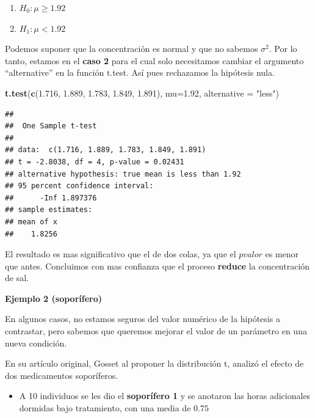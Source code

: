 \documentclass[
]{book}
\newenvironment{Shaded}{\begin{snugshade}}{\end{snugshade}}
\newcommand{\AttributeTok}[1]{\textcolor[rgb]{0.13,0.29,0.53}{#1}}
\newcommand{\FloatTok}[1]{\textcolor[rgb]{0.00,0.00,0.81}{#1}}
\newcommand{\FunctionTok}[1]{\textcolor[rgb]{0.13,0.29,0.53}{\textbf{#1}}}
\newcommand{\NormalTok}[1]{#1}
\newcommand{\StringTok}[1]{\textcolor[rgb]{0.31,0.60,0.02}{#1}}
\providecommand{\tightlist}{%
  \setlength{\itemsep}{0pt}\setlength{\parskip}{0pt}}
\begin{document}
\begin{enumerate}
\def\labelenumi{\alph{enumi}.}
\tightlist
\item
  \(H_0:\mu\geq 1.92\)
\item
  \(H_1:\mu < 1.92\)
\end{enumerate}

Podemos suponer que la concentración es normal y que no sabemos \(\sigma^2\). Por lo tanto, estamos en el \textbf{caso 2} para el cual solo necesitamos cambiar el argumento ``alternative'' en la función t.test. Así pues rechazamos la hipótesis nula.

\begin{Shaded}
\begin{Highlighting}[]
\FunctionTok{t.test}\NormalTok{(}\FunctionTok{c}\NormalTok{(}\FloatTok{1.716}\NormalTok{, }\FloatTok{1.889}\NormalTok{, }\FloatTok{1.783}\NormalTok{, }\FloatTok{1.849}\NormalTok{, }\FloatTok{1.891}\NormalTok{), }
       \AttributeTok{mu=}\FloatTok{1.92}\NormalTok{, }\AttributeTok{alternative =} \StringTok{"less"}\NormalTok{)}
\end{Highlighting}
\end{Shaded}

\begin{verbatim}
## 
##  One Sample t-test
## 
## data:  c(1.716, 1.889, 1.783, 1.849, 1.891)
## t = -2.8038, df = 4, p-value = 0.02431
## alternative hypothesis: true mean is less than 1.92
## 95 percent confidence interval:
##      -Inf 1.897376
## sample estimates:
## mean of x 
##    1.8256
\end{verbatim}

El resultado es mas significativo que el de dos colas, ya que el \(pvalor\) es menor que antes. Concluimos con mas confianza que el proceso \textbf{reduce} la concentración de sal.

\textbf{Ejemplo 2 (soporífero)}

En algunos casos, no estamos seguros del valor numérico de la hipótesis a contrastar, pero sabemos que queremos mejorar el valor de un parámetro en una nueva condición.

En su artículo original, Gosset al proponer la distribución t, analizó el efecto de dos medicamentos soporíferos.

\begin{itemize}
\tightlist
\item
  A 10 individuos se les dio el \textbf{soporífero 1} y se anotaron las horas adicionales dormidas bajo tratamiento, con una media de \(0.75\)
\end{itemize}
\end{document}
